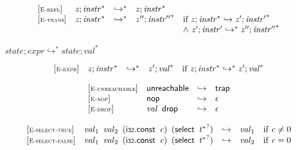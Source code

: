 $$
\begin{array}{@{}l@{}lcl@{}l@{}}
{[\textsc{\scriptsize E{-}refl}]} \quad & {\mathit{z}} ; {{\mathit{instr}}^\ast} &\hookrightarrow^\ast& {\mathit{z}} ; {{\mathit{instr}}^\ast} &  \\
{[\textsc{\scriptsize E{-}trans}]} \quad & {\mathit{z}} ; {{\mathit{instr}}^\ast} &\hookrightarrow^\ast& {\mathit{z}''} ; {{{\mathit{instr}}''}^\ast} &\quad
  \mbox{if}~{\mathit{z}} ; {{\mathit{instr}}^\ast} \hookrightarrow {\mathit{z}'} ; {{{\mathit{instr}}'}^\ast} \\
 &&&&\quad {\land}~{\mathit{z}'} ; {{\mathit{instr}}'} \hookrightarrow^\ast {\mathit{z}''} ; {{{\mathit{instr}}''}^\ast} \\
\end{array}
$$

\vspace{1ex}

$\boxed{{\mathit{state}} ; {\mathit{expr}} \hookrightarrow^\ast {\mathit{state}} ; {{\mathit{val}}^\ast}}$

$$
\begin{array}{@{}l@{}lcl@{}l@{}}
{[\textsc{\scriptsize E{-}expr}]} \quad & {\mathit{z}} ; {{\mathit{instr}}^\ast} &\hookrightarrow^\ast& {\mathit{z}'} ; {{\mathit{val}}^\ast} &\quad
  \mbox{if}~{\mathit{z}} ; {{\mathit{instr}}^\ast} \hookrightarrow^\ast {\mathit{z}'} ; {{\mathit{val}}^\ast} \\
\end{array}
$$

\vspace{1ex}

\vspace{1ex}

$$
\begin{array}{@{}l@{}lcl@{}l@{}}
{[\textsc{\scriptsize E{-}unreachable}]} \quad & \mathsf{unreachable} &\hookrightarrow& \mathsf{trap} &  \\
{[\textsc{\scriptsize E{-}nop}]} \quad & \mathsf{nop} &\hookrightarrow& \epsilon &  \\
{[\textsc{\scriptsize E{-}drop}]} \quad & {\mathit{val}}~\,\mathsf{drop} &\hookrightarrow& \epsilon &  \\
\end{array}
$$

\vspace{1ex}

$$
\begin{array}{@{}l@{}lcl@{}l@{}}
{[\textsc{\scriptsize E{-}select{-}true}]} \quad & {\mathit{val}}_{{1}}~\,{\mathit{val}}_{{2}}~\,(\mathsf{i{\scriptstyle32}}.\mathsf{const}~\,{\mathit{c}})~\,(\mathsf{select}~\,{{{\mathit{t}}^\ast}^?}) &\hookrightarrow& {\mathit{val}}_{{1}} &\quad
  \mbox{if}~{\mathit{c}} \neq 0 \\
{[\textsc{\scriptsize E{-}select{-}false}]} \quad & {\mathit{val}}_{{1}}~\,{\mathit{val}}_{{2}}~\,(\mathsf{i{\scriptstyle32}}.\mathsf{const}~\,{\mathit{c}})~\,(\mathsf{select}~\,{{{\mathit{t}}^\ast}^?}) &\hookrightarrow& {\mathit{val}}_{{2}} &\quad
  \mbox{if}~{\mathit{c}} = 0 \\
\end{array}
$$


